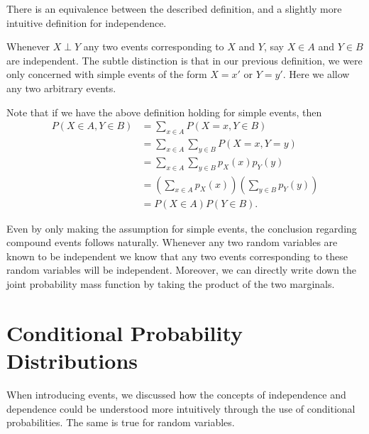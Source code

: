 \documentclass[
  letterpaper,
  DIV=11,
  numbers=noendperiod]{scrreprt}
\theoremstyle{definition}
\theoremstyle{definition}
\theoremstyle{definition}
\theoremstyle{remark}
\begin{document}
\begin{tcolorbox}[enhanced jigsaw, coltitle=black, colframe=quarto-callout-warning-color-frame, colbacktitle=quarto-callout-warning-color!10!white, bottomrule=.15mm, opacitybacktitle=0.6, colback=white, toptitle=1mm, arc=.35mm, leftrule=.75mm, bottomtitle=1mm, opacityback=0, breakable, rightrule=.15mm, title={Equivalent Definition of Independence}, left=2mm, titlerule=0mm, toprule=.15mm]

There is an equivalence between the described definition, and a slightly
more intuitive definition for independence.

Whenever \(X\perp Y\) any two events corresponding to \(X\) and \(Y\),
say \(X \in A\) and \(Y \in B\) are independent. The subtle distinction
is that in our previous definition, we were only concerned with simple
events of the form \(X=x'\) or \(Y=y'\). Here we allow any two arbitrary
events.

Note that if we have the above definition holding for simple events,
then \begin{align*}
P(X \in A, Y \in B) &= \sum_{x\in A}P(X=x,Y\in B) \\
&= \sum_{x\in A}\sum_{y \in B} P(X=x,Y=y)\\
&= \sum_{x\in A}\sum_{y \in B} p_X(x)p_Y(y) \\
&= \left(\sum_{x\in A}p_X(x)\right)\left(\sum_{y\in B}p_Y(y)\right)\\
&= P(X\in A)P(Y\in B).
\end{align*}

Even by only making the assumption for simple events, the conclusion
regarding compound events follows naturally. Whenever any two random
variables are known to be independent we know that any two events
corresponding to these random variables will be independent. Moreover,
we can directly write down the joint probability mass function by taking
the product of the two marginals.

\end{tcolorbox}

\section{Conditional Probability
Distributions}\label{conditional-probability-distributions}

When introducing events, we discussed how the concepts of independence
and dependence could be understood more intuitively through the use of
conditional probabilities. The same is true for random variables.
\end{document}
